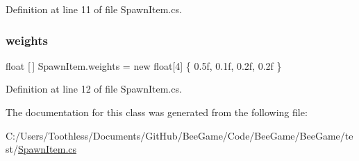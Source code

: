 Definition at line 11 of file Spawn\+Item.\+cs.

\mbox{\label{class_spawn_item_a52966f3825c8c50f79c0a9a1ba300b52}} 
\subsubsection{\texorpdfstring{weights}{weights}}
{\footnotesize\ttfamily float \mbox{[}$\,$\mbox{]} Spawn\+Item.\+weights = new float\mbox{[}4\mbox{]} \{ 0.\+5f, 0.\+1f, 0.\+2f, 0.\+2f \}\hspace{0.3cm}{\ttfamily [private]}}



Definition at line 12 of file Spawn\+Item.\+cs.



The documentation for this class was generated from the following file\+:\begin{DoxyCompactItemize}
\item 
C\+:/\+Users/\+Toothless/\+Documents/\+Git\+Hub/\+Bee\+Game/\+Code/\+Bee\+Game/\+Bee\+Game/test/\hyperlink{_spawn_item_8cs}{Spawn\+Item.\+cs}\end{DoxyCompactItemize}
